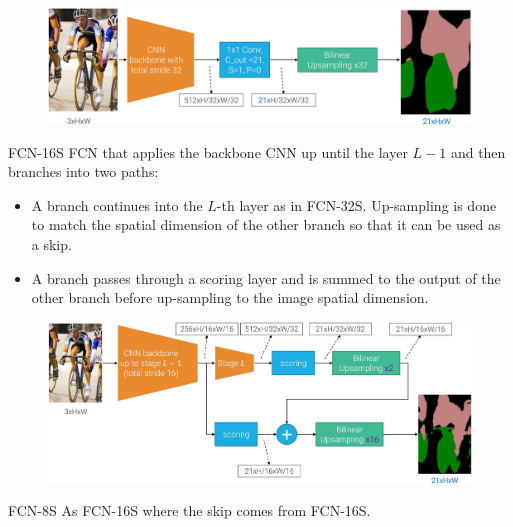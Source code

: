 \begin{description}
\begin{description}
\begin{descriptionlist}
                        \begin{figure}[H]
                            \raggedleft
                            \includegraphics[width=0.85\linewidth]{./img/_fcn_32.jpg}
                        \end{figure}

                    \item[FCN-16S] 
                        FCN that applies the backbone CNN up until the layer $L-1$ and then branches into two paths:
                        \begin{itemize}
                            \item A branch continues into the $L$-th layer as in FCN-32S. Up-sampling is done to match the spatial dimension of the other branch so that it can be used as a skip.
                            \item A branch passes through a scoring layer and is summed to the output of the other branch before up-sampling to the image spatial dimension.
                        \end{itemize}

                        \begin{figure}[H]
                            \raggedleft
                            \includegraphics[width=0.85\linewidth]{./img/_fcn_16.jpg}
                        \end{figure}

                    \item[FCN-8S] 
                        As FCN-16S where the skip comes from FCN-16S.


\end{descriptionlist}
\end{description}
\end{description}
